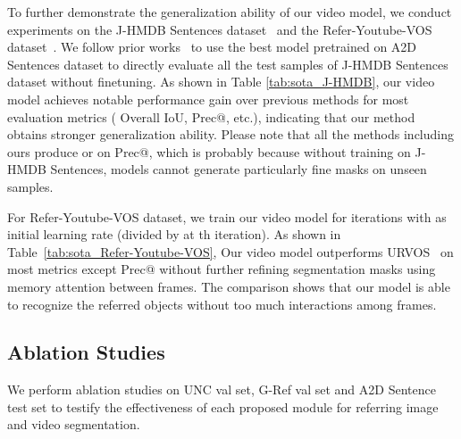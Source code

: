 \documentclass[10pt,journal,cspaper,compsoc]{IEEEtran}
\begin{document}
To further demonstrate the generalization ability of our video model, we conduct experiments on the J-HMDB Sentences dataset~\cite{gavrilyuk2018actor} and the Refer-Youtube-VOS dataset~\cite{seo2020urvos}. 
We follow prior works~\cite{gavrilyuk2018actor, wang2019asymmetric, ning2020polar} to use the best model pretrained on A2D Sentences dataset to directly evaluate all the test samples of J-HMDB Sentences dataset without finetuning. 
As shown in Table \ref{tab:sota_J-HMDB}, our video model achieves notable performance gain over previous methods for most evaluation metrics ( Overall IoU,  Prec@, etc.), indicating that our method obtains stronger generalization ability. 
Please note that all the methods including ours produce  or  on Prec@, which is probably because without training on J-HMDB Sentences, models cannot generate particularly fine masks on unseen samples.

For Refer-Youtube-VOS dataset, we train our video model for  iterations with  as initial learning rate (divided by  at th iteration). As shown in Table~\ref{tab:sota_Refer-Youtube-VOS}, Our video model outperforms URVOS~\cite{seo2020urvos} on most metrics except Prec@ without further refining segmentation masks using memory attention between frames. 
The comparison shows that our model is able to recognize the referred objects without too much interactions among frames.

\subsection{Ablation Studies}
We perform ablation studies on UNC val set, G-Ref val set and A2D Sentence test set to testify the effectiveness of each proposed module for referring image and video segmentation.
\end{document}
